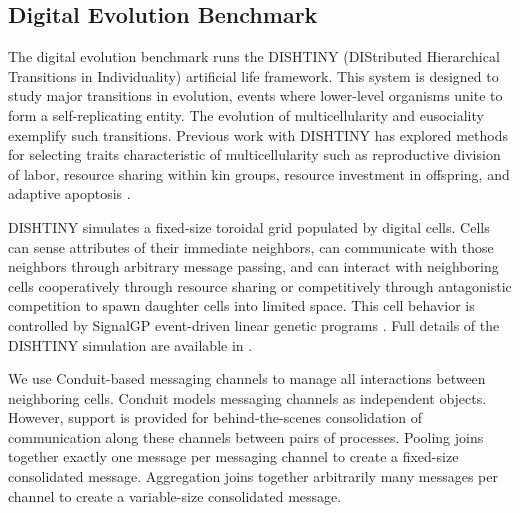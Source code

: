 \subsection{ Digital Evolution Benchmark } \label{sec:digital_evolution_benchmark}

The digital evolution benchmark runs the DISHTINY (DIStributed Hierarchical Transitions in Individuality) artificial life framework.
This system is designed to study major transitions in evolution, events where lower-level organisms unite to form a self-replicating entity.
The evolution of multicellularity and eusociality exemplify such transitions.
Previous work with DISHTINY has explored methods for selecting traits characteristic of multicellularity such as reproductive division of labor, resource sharing within kin groups, resource investment in offspring, and adaptive apoptosis \citep{moreno2019toward}.

DISHTINY simulates a fixed-size toroidal grid populated by digital cells.
Cells can sense attributes of their immediate neighbors, can communicate with those neighbors through arbitrary message passing, and can interact with neighboring cells cooperatively through resource sharing or competitively through antagonistic competition to spawn daughter cells into limited space.
This cell behavior is controlled by SignalGP event-driven linear genetic programs \citep{lalejini2018evolving}.
Full details of the DISHTINY simulation are available in \citep{moreno2021exploring}.

We use Conduit-based messaging channels to manage all interactions between neighboring cells.
Conduit models messaging channels as independent objects.
However, support is provided for behind-the-scenes consolidation of communication along these channels between pairs of processes.
Pooling joins together exactly one message per messaging channel to create a fixed-size consolidated message.
Aggregation joins together arbitrarily many messages per channel to create a variable-size consolidated message.


